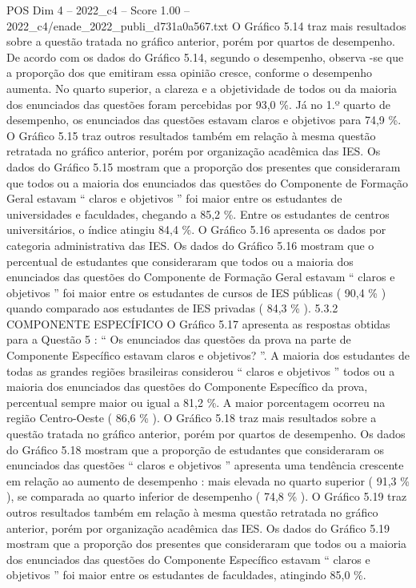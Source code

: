 \begin{textsample}{POS Dim 4 – 2022\_c4 – Score 1.00 – 2022\_c4/enade\_2022\_publi\_d731a0a567.txt}
O Gráfico 5.14 traz mais resultados sobre a questão tratada no gráfico anterior, porém por quartos de desempenho.
De acordo com os dados do Gráfico 5.14, segundo o desempenho, observa -se que a proporção dos que emitiram essa opinião cresce, conforme o desempenho aumenta.
No quarto superior, a clareza e a objetividade de todos ou da maioria dos enunciados das questões foram percebidas por 93,0 \%.
Já no 1.º quarto de desempenho, os enunciados das questões estavam claros e objetivos para 74,9 \%.
O Gráfico 5.15 traz outros resultados também em relação à mesma questão retratada no gráfico anterior, porém por organização acadêmica das IES.
Os dados do Gráfico 5.15 mostram que a proporção dos presentes que consideraram que todos ou a maioria dos enunciados das questões do Componente de Formação Geral estavam “ claros e objetivos ” foi maior entre os estudantes de universidades e faculdades, chegando a 85,2 \%.
Entre os estudantes de centros universitários, o índice atingiu 84,4 \%.
O Gráfico 5.16 apresenta os dados por categoria administrativa das IES.
Os dados do Gráfico 5.16 mostram que o percentual de estudantes que consideraram que todos ou a maioria dos enunciados das questões do Componente de Formação Geral estavam “ claros e objetivos ” foi maior entre os estudantes de cursos de IES públicas ( 90,4 \% ) quando comparado aos estudantes de IES privadas ( 84,3 \% ). 5.3.2 COMPONENTE ESPECÍFICO O Gráfico 5.17 apresenta as respostas obtidas para a Questão 5 : “ Os enunciados das questões da prova na parte de Componente Específico estavam claros e objetivos? ”.
A maioria dos estudantes de todas as grandes regiões brasileiras considerou “ claros e objetivos ” todos ou a maioria dos enunciados das questões do Componente Específico da prova, percentual sempre maior ou igual a 81,2 \%.
A maior porcentagem ocorreu na região Centro-Oeste ( 86,6 \% ).
O Gráfico 5.18 traz mais resultados sobre a questão tratada no gráfico anterior, porém por quartos de desempenho.
Os dados do Gráfico 5.18 mostram que a proporção de estudantes que consideraram os enunciados das questões “ claros e objetivos ” apresenta uma tendência crescente em relação ao aumento de desempenho : mais elevada no quarto superior ( 91,3 \% ), se comparada ao quarto inferior de desempenho ( 74,8 \% ).
O Gráfico 5.19 traz outros resultados também em relação à mesma questão retratada no gráfico anterior, porém por organização acadêmica das IES.
Os dados do Gráfico 5.19 mostram que a proporção dos presentes que consideraram que todos ou a maioria dos enunciados das questões do Componente Específico estavam “ claros e objetivos ” foi maior entre os estudantes de faculdades, atingindo 85,0 \%.

\end{textsample}
